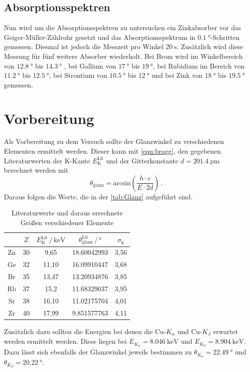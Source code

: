 \subsection{Absorptionsspektren}
Nun wird um die Absorptionsspektren zu untersuchen ein Zinkabsorber vor das Geiger-Müller-Zählrohr gesetzt und das Absorptionsspektrum in $\SI{0.1}{\degree}$-Schritten gemessen. Diesmal ist
jedoch die Messzeit pro Winkel $\SI{20}{\second}$. Zusätzlich wird diese Messung für fünf weitere Absorber wiederholt. Bei Brom wird im Winkelbereich von $\SI{12.8}{\degree}$ bis $\SI{14.3}{\degree}$
, bei Gallium von $\SI{17}{\degree}$ bis $\SI{19}{\degree}$, bei Rubidium im Bereich von $\SI{11.2}{\degree}$ bis $\SI{12.5}{\degree}$, bei Strontium von $\SI{10.5}{\degree}$ bis $\SI{12}{\degree}$
und bei Zink von $\SI{18}{\degree}$ bis $\SI{19.5}{\degree}$ gemessen.



\section{Vorbereitung}
Als Vorbereitung zu dem Versuch sollte der Glanzwinkel zu verschiedenen Elementen ermittelt werden. Dieser kann mit \autoref{eqn:bragg}, den gegebenen Literaturwerten der 
K-Kante $E_\text{K}^\text{Lit}$ \cite{wissen} und der Gitterkonstante $d = \SI{201.4}{\pico\meter}$ berechnet werden mit 
\begin{equation}
    \theta_\text{glanz} = \text{arcsin}\left(\frac{h \cdot c}{E \cdot 2d}\right) \, .
    \label{eqn:theta}
\end{equation}
\noindent
Daraus folgen die Werte, die in der \autoref{tab:Glanz} aufgeführt sind. 
\begin{table}
    \centering
    \caption{Literaturwerte und daraus errechnete Größen verschiedener Elemente}
    \label{tab:Glanz}
    \begin{tabular}{c c c c c}
    \toprule
    $ $ & $Z$ & $E_\text{K}^\text{Lit} \,/\, \si{\kilo\eV}$
    & $\theta_\text{glanz}^\text{Lit} \,/\, \si{\degree}$ & 
    $\sigma_\text{k}$\\
    \midrule 
    Zn & 30 &  9,65 & 18.60042993 & 3,56 \\
    Ge & 32 & 11,10 & 16.09910447 & 3,68 \\
    Br & 35 & 13,47 & 13.20934876 & 3,85 \\
    Rb & 37 & 15,2 & 11.68329037 & 3,95 \\
    Sr & 38 & 16,10 & 11.02175704 & 4,01 \\
    Zr & 40 & 17,99 &  9.851577763 & 4,11 \\
    \bottomrule
    \end{tabular}
    \end{table}

\noindent
Zusätzlich dazu sollten die Energien bei denen die Cu-$K_\alpha$ und Cu-$K_\beta$ erwartet werden ermittelt werden. Diese liegen bei $E_{K_\alpha} = \SI{8.046}{\kilo\eV}$ und $E_{K_\beta} = \SI{8.904}{\kilo\eV}$.
Dazu lässt sich ebenfalls der Glanzwinkel jeweils bestimmen zu $\theta_{K_\alpha} = \SI{22.49}{\degree}$ und $\theta_{K_\beta} = \SI{20.22}{\degree}$.
